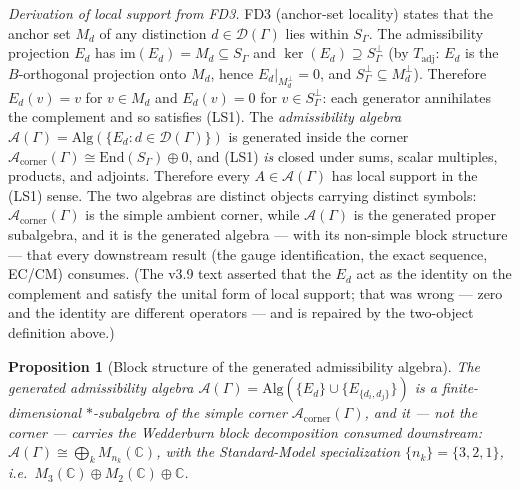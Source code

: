 \documentclass[11pt]{article}
\newtheorem{proposition}[theorem]{Proposition}
\theoremstyle{definition}
\begin{document}
\noindent\textit{Derivation of local support from FD3.}\quad
FD3 (anchor-set locality) states that the anchor set $M_d$ of any
distinction $d \in \mathcal{D}(\Gamma)$ lies within $S_\Gamma$.
The admissibility projection $E_d$ has $\mathrm{im}(E_d) = M_d
\subseteq S_\Gamma$ and $\ker(E_d) \supseteq S_\Gamma^\perp$ (by
$T_{\mathrm{adj}}$: $E_d$ is the $B$-orthogonal projection onto $M_d$,
hence $E_d|_{M_d^\perp} = 0$, and $S_\Gamma^\perp \subseteq M_d^\perp$).
Therefore $E_d(v) = v$ for $v \in M_d$ and $E_d(v) = 0$ for
$v \in S_\Gamma^\perp$: each generator annihilates the complement and
so satisfies (LS1).  The \emph{admissibility algebra}
$\mathcal{A}(\Gamma) = \mathrm{Alg}(\{E_d : d \in \mathcal{D}(\Gamma)\})$
is generated inside the corner $\mathcal{A}_{\mathrm{corner}}(\Gamma)
\cong \mathrm{End}(S_\Gamma) \oplus 0$, and
(LS1) \emph{is} closed under sums, scalar multiples, products, and
adjoints.  Therefore every $A \in \mathcal{A}(\Gamma)$ has local
support in the (LS1) sense.  The two algebras are distinct objects
carrying distinct symbols: $\mathcal{A}_{\mathrm{corner}}(\Gamma)$ is
the simple ambient corner, while $\mathcal{A}(\Gamma)$ is the
generated proper subalgebra, and it is the generated algebra --- with
its non-simple block structure --- that every downstream result (the
gauge identification, the exact sequence, EC/CM) consumes.  (The v3.9 text asserted that the $E_d$
act as the identity on the complement and satisfy the unital form of
local support; that was wrong --- zero and the identity are different
operators --- and is repaired by the two-object definition above.)

\begin{proposition}[Block structure of the generated admissibility algebra]
\label{prop:generated_block_structure}
The generated admissibility algebra
$\mathcal{A}(\Gamma) = \mathrm{Alg}(\{E_d\} \cup \{E_{\{d_i,d_j\}}\})$
is a finite-dimensional $*$-subalgebra of the simple corner
$\mathcal{A}_{\mathrm{corner}}(\Gamma)$, and it --- not the corner ---
carries the Wedderburn block decomposition consumed downstream:
$\mathcal{A}(\Gamma) \cong \bigoplus_k M_{n_k}(\mathbb{C})$, with the
Standard-Model specialization $\{n_k\} = \{3,2,1\}$, i.e.\
$M_3(\mathbb{C}) \oplus M_2(\mathbb{C}) \oplus \mathbb{C}$.
\end{proposition}
\end{document}
